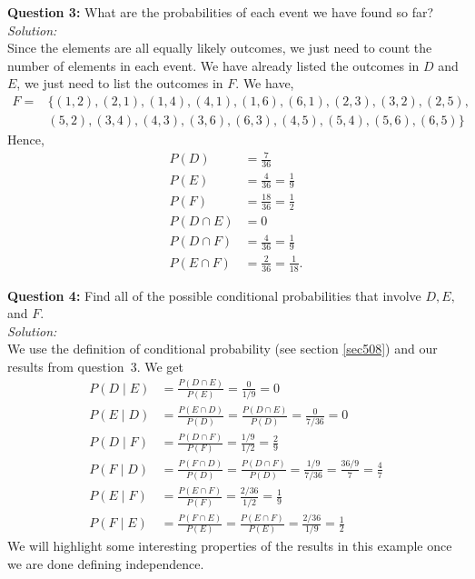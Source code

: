 \noindent \textbf{Question 3:} What are the probabilities of each event we have found so far? \\

\textit{Solution:} \\
Since the elements are all equally likely outcomes, we just need to count the number of elements in each event. We have already listed the outcomes in $D$ and $E$, we just need to list the outcomes in $F$. We have,
\begin{align*}
F = &\{(1,2),(2,1),(1,4),(4,1),(1,6),(6,1),(2,3),(3,2),(2,5), \\
       & (5,2),(3,4),(4,3),(3,6),(6,3),(4,5),(5,4),(5,6),(6,5)\}
\end{align*}
Hence,
\begin{align*}
P(D) & = \frac{7}{36} \tag{since $|D| = 7$} \\
P(E) & = \frac{4}{36} = \frac{1}{9} \tag{since $|E| = 4$} \\
P(F) & = \frac{18}{36} = \frac{1}{2} \tag{since $|F| = 18$} \\
P(D \cap E) & = 0 \tag{since $|D \cap E| = 0$} \\
P(D \cap F) & = \frac{4}{36} = \frac{1}{9} \tag{since $|D \cap F| = 4$} \\
P(E \cap F) & = \frac{2}{36} = \frac{1}{18} \tag{since $|E \cap F| = 2$}.
\end{align*}

\noindent \textbf{Question 4:} Find all of the possible conditional probabilities that involve $D,E,$ and $F$. \\

\textit{Solution:} \\
We use the definition of conditional probability (see section \ref{sec508}) and our results from question~3. We get
\begin{align*}
P(D\! \mid \! E) & = \frac{P(D \cap E)}{P(E)} = \frac{0}{1/9} = 0\\
P(E\! \mid \! D) & = \frac{P(E \cap D)}{P(D)} = \frac{P(D \cap E)}{P(D)} = \frac{0}{7/36} = 0\\
P(D\! \mid \! F) & = \frac{P(D \cap F)}{P(F)} = \frac{1/9}{1/2} = \frac{2}{9}\\
P(F \! \mid \! D) & = \frac{P(F \cap D)}{P(D)} = \frac{P(D \cap F)}{P(D)} = \frac{1/9}{7/36} = \frac{36/9}{7} = \frac{4}{7} \\
P(E \! \mid \! F) & = \frac{P(E \cap F)}{P(F)} = \frac{2/36}{1/2} = \frac{1}{9}\\
P(F\! \mid \! E) & = \frac{P(F \cap E)}{P(E)} = \frac{P(E \cap F)}{P(E)} = \frac{2/36}{1/9} = \frac{1}{2}
\end{align*}
We will highlight some interesting properties of the results in this example once we are done defining independence.

